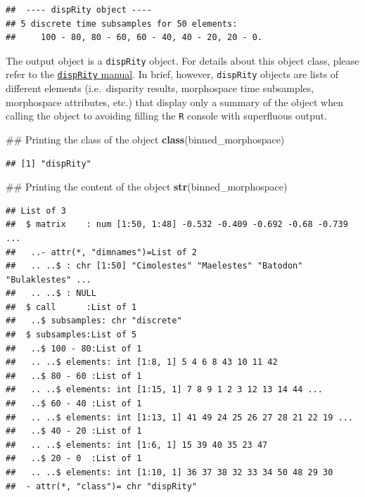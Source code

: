 \documentclass[]{book}
\newenvironment{Shaded}{\begin{snugshade}}{\end{snugshade}}
\newcommand{\KeywordTok}[1]{\textcolor[rgb]{0.13,0.29,0.53}{\textbf{#1}}}
\newcommand{\NormalTok}[1]{#1}
\theoremstyle{definition}
\theoremstyle{definition}
\theoremstyle{remark}
\begin{document}
\begin{verbatim}
##  ---- dispRity object ---- 
## 5 discrete time subsamples for 50 elements:
##     100 - 80, 80 - 60, 60 - 40, 40 - 20, 20 - 0.
\end{verbatim}

The output object is a \texttt{dispRity} object. For details about this
object class, please refer to the
\href{http://htmlpreview.github.com/?https://github.com/TGuillerme/dispRity/blob/master/doc/dispRity-manual.html}{\texttt{dispRity}
manual}. In brief, however, \texttt{dispRity} objects are lists of
different elements (i.e.~disparity results, morphospace time subsamples,
morphospace attributes, etc.) that display only a summary of the object
when calling the object to avoiding filling the \texttt{R} console with
superfluous output.

\begin{Shaded}
\begin{Highlighting}[]
\NormalTok{## Printing the class of the object}
\KeywordTok{class}\NormalTok{(binned_morphospace)}
\end{Highlighting}
\end{Shaded}

\begin{verbatim}
## [1] "dispRity"
\end{verbatim}

\begin{Shaded}
\begin{Highlighting}[]
\NormalTok{## Printing the content of the object}
\KeywordTok{str}\NormalTok{(binned_morphospace)}
\end{Highlighting}
\end{Shaded}

\begin{verbatim}
## List of 3
##  $ matrix    : num [1:50, 1:48] -0.532 -0.409 -0.692 -0.68 -0.739 ...
##   ..- attr(*, "dimnames")=List of 2
##   .. ..$ : chr [1:50] "Cimolestes" "Maelestes" "Batodon" "Bulaklestes" ...
##   .. ..$ : NULL
##  $ call      :List of 1
##   ..$ subsamples: chr "discrete"
##  $ subsamples:List of 5
##   ..$ 100 - 80:List of 1
##   .. ..$ elements: int [1:8, 1] 5 4 6 8 43 10 11 42
##   ..$ 80 - 60 :List of 1
##   .. ..$ elements: int [1:15, 1] 7 8 9 1 2 3 12 13 14 44 ...
##   ..$ 60 - 40 :List of 1
##   .. ..$ elements: int [1:13, 1] 41 49 24 25 26 27 28 21 22 19 ...
##   ..$ 40 - 20 :List of 1
##   .. ..$ elements: int [1:6, 1] 15 39 40 35 23 47
##   ..$ 20 - 0  :List of 1
##   .. ..$ elements: int [1:10, 1] 36 37 38 32 33 34 50 48 29 30
##  - attr(*, "class")= chr "dispRity"
\end{verbatim}
\end{document}
